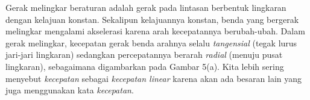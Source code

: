 \documentclass[12pt, a4paper]{article}\usepackage[utf8]{inputenc}
\theoremstyle{plain}
\theoremstyle{plain}
\numberwithin{equation}{section}
\theoremstyle{definition}
\begin{document}
	Gerak melingkar beraturan adalah gerak pada lintasan berbentuk lingkaran dengan kelajuan konstan. Sekalipun kelajuannya konstan, benda yang bergerak melingkar mengalami akselerasi karena arah kecepatannya berubah-ubah. Dalam gerak melingkar, kecepatan gerak benda arahnya selalu \textit{tangensial} (tegak lurus jari-jari lingkaran) sedangkan percepatannya berarah \textit{radial} (menuju pusat lingkaran), sebagaimana digambarkan pada Gambar 5(a). Kita lebih sering menyebut \textit{kecepatan} sebagai \textit{kecepatan linear} karena akan ada besaran lain yang juga menggunakan kata \textit{kecepatan}.
	\begin{figure}[htb]
		\centering
\end{figure}
\end{document}
